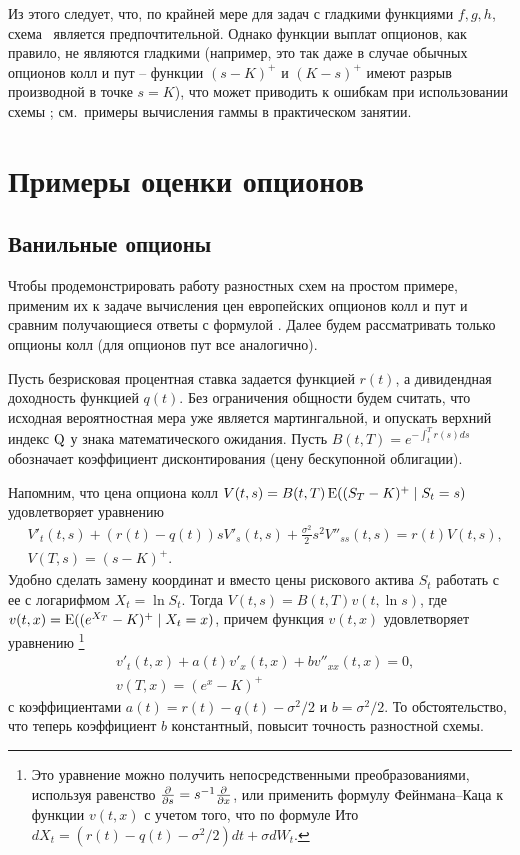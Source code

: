 Из этого следует, что, по крайней мере для задач с гладкими функциями $f,g,h$, схема \cn\ является предпочтительной.
Однако функции выплат опционов, как правило, не являются гладкими (например, это так даже в случае обычных опционов колл и пут -- функции $(s-K)^+$ и $(K-s)^+$ имеют разрыв производной в точке $s=K$), что может приводить к ошибкам при использовании схемы \cn; см.~примеры вычисления гаммы в практическом занятии.


\section{Примеры оценки опционов}
\subsection{Ванильные опционы}

Чтобы продемонстрировать работу разностных схем на простом примере, применим их к задаче вычисления цен европейских опционов колл и пут и сравним получающиеся ответы с формулой \bs.
Далее будем рассматривать только опционы колл (для опционов пут все аналогично).

Пусть безрисковая процентная ставка задается функцией $r(t)$, а дивидендная доходность функцией $q(t)$.
Без ограничения общности будем считать, что исходная вероятностная мера уже является мартингальной, и опускать верхний индекс $\mathrm{Q}$ у знака математического ожидания.
Пусть $B(t,T) = e^{-\int_t^T r(s) ds}$ обозначает коэффициент дисконтирования (цену бескупонной облигации).

Напомним, что цена опциона колл $V(t,s) = B(t,T) \operatorname{E}((S_T-K)^+ \mid S_t = s)$ удовлетворяет уравнению
\begin{align*}[left=\empheqlbrace]
&V'_t(t,s) + (r(t)-q(t))sV'_s(t,s) + \frac{\sigma^2}{2} s^2 V''_{ss}(t,s) = r(t)V(t,s),\\
&V(T,s) = (s-K)^+.
\end{align*}
Удобно сделать замену координат и вместо цены рискового актива $S_t$ работать с ее с логарифмом $X_t=\ln S_t$.
Тогда $V(t,s) = B(t,T) v(t, \ln s)$, где
$v(t,x) = \operatorname{E} ((e^{X_T} - K)^+ \mid X_t = x)$, причем функция $v(t,x)$ удовлетворяет уравнению%
\footnote{Это уравнение можно получить непосредственными преобразованиями, используя равенство $\frac{\partial }{\partial s} = s^{-1}\frac{\partial }{\partial x}$, или применить формулу Фейнмана--Каца к функции $v(t,x)$ с учетом того, что по формуле Ито $d X_t = (r(t)-q(t) - \sigma^2/2) dt + \sigma d W_t$.}
\begin{align}[left=\empheqlbrace]
\label{13:log-pde}
&v'_t(t,x) + a(t)v'_x(t,x) + b v''_{xx}(t,x) = 0,\\
\label{13:log-initial}
&v(T,x) = (e^x - K)^+
\end{align}
с коэффициентами $a(t) = r(t) - q(t) - \sigma^2/2$ и $b = \sigma^2/2$.
То обстоятельство, что теперь коэффициент $b$ константный, повысит точность разностной схемы.

